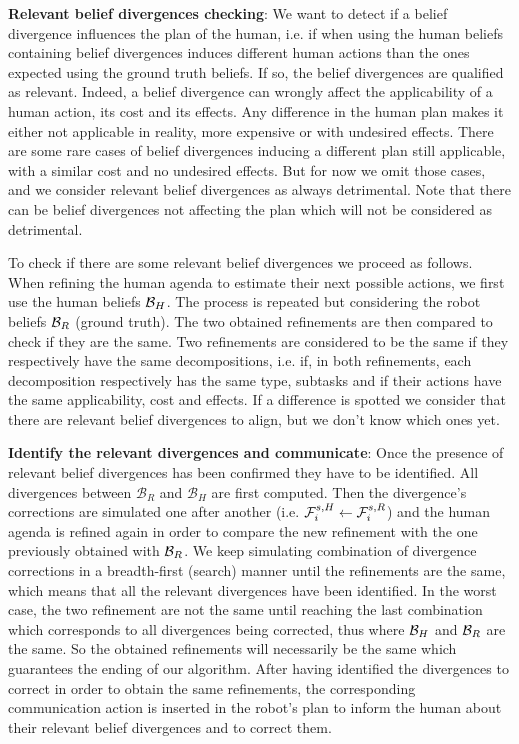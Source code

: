 \documentclass[letterpaper]{article} %
\begin{document}
\textbf{Relevant belief divergences checking}:
We want to detect if a belief divergence influences the plan of the human, i.e. if when using the human beliefs containing belief divergences induces different human actions than the ones expected using the ground truth beliefs. If so, the belief divergences are qualified as relevant. Indeed, a belief divergence can wrongly affect the applicability of a human action, its cost and its effects. 
Any difference in the human plan makes it either not applicable in reality, more expensive or with undesired effects. There are some rare cases of belief divergences inducing a different plan still applicable, with a similar cost and no undesired effects. But for now we omit those cases, and we consider relevant belief divergences as always detrimental. 
Note that there can be belief divergences not affecting the plan which will not be considered as detrimental.

To check if there are some relevant belief divergences we proceed as follows. When refining the human agenda to estimate their next possible actions, we first use the human beliefs $\mathcal{B}_H$. The process is repeated but considering the robot beliefs $\mathcal{B}_R$ (ground truth). The two obtained refinements are then compared to check if they are the same. Two refinements are considered to be the same if they respectively have the same decompositions, i.e. if, in both refinements, each decomposition respectively has the same type, subtasks and if their actions have the same applicability, cost and effects. 
If a difference is spotted we consider that there are relevant belief divergences to align, but we don't know which ones yet.

\textbf{Identify the relevant divergences and communicate}: 
Once the presence of relevant belief divergences has been confirmed they have to be identified. All divergences between $\mathcal{B}_R$ and $\mathcal{B}_H$ are first computed. Then the divergence's corrections are simulated one after another (i.e. $ \mathcal{F}^{s,H}_{i}{} \gets \mathcal{F}^{s,R}_{i}{}$) and the human agenda is refined again in order to compare the new refinement with the one previously obtained with $\mathcal{B}_R$. We keep simulating combination of divergence corrections in a breadth-first (search) manner until the refinements are the same, which means that all the relevant divergences have been identified. In the worst case, the two refinement are not the same until reaching the last combination which corresponds to all divergences being corrected, thus where $\mathcal{B}_H$ and $\mathcal{B}_R$ are the same. So the obtained refinements will necessarily be the same which guarantees the ending of our algorithm. After having identified the divergences to correct in order to obtain the same refinements, the corresponding communication action is inserted in the robot's plan to inform the human about their relevant belief divergences and to correct them.
    
\end{document}
